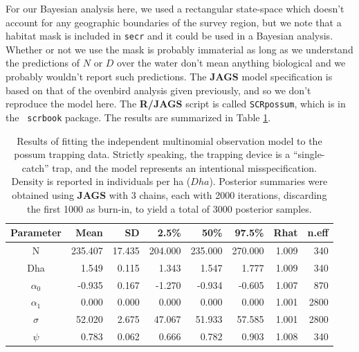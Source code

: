 For our Bayesian analysis here, we used a rectangular state-space
which doesn't account for any geographic boundaries of the survey
region, but we note that a habitat mask is included in {\tt secr} and
it could be used in a Bayesian analysis.  Whether or not we use the
mask is probably immaterial as long as we understand the predictions
of $N$ or $D$ over the water don't mean anything biological and we
probably wouldn't report such predictions.  The {\bf JAGS} model
specification is based on that of the ovenbird analysis given
previously, and so we don't reproduce the model here. The {\bf R/JAGS}
script is called \mbox{\tt SCRpossum}, which is in the \mbox{\tt
  scrbook} package.  The results are summarized in Table
\ref{poisson-mn.tab.possum}.



\begin{table}[ht]
\centering
\caption{Results of fitting the independent multinomial observation
 model to the possum trapping data. Strictly speaking, the trapping
  device is a ``single-catch'' trap, and the model represents an intentional
  misspecification. Density is reported in individuals per ha ($Dha$).
Posterior summaries were obtained using {\bf JAGS} with
 3 chains, each with 2000 iterations, discarding the first 1000 as
 burn-in, to yield a total of 3000 posterior samples.
}
\begin{tabular}{crrrrrrr} \hline \hline
 Parameter & Mean &  SD   & 2.5\% & 50\%  & 97.5\% &Rhat& n.eff \\ \hline
N        & 235.407&  17.435& 204.000& 235.000& 270.000& 1.009&   340\\
Dha      & 1.549  &  0.115&   1.343 &  1.547 &  1.777 &1.009 &  340\\
$\alpha_0$   &-0.935  &  0.167 & -1.270 & -0.934 &  -0.605& 1.007&   870\\
$\alpha_1$   &0.000   & 0.000  & 0.000  & 0.000  &   0.000& 1.001&  2800\\
$\sigma$   &52.020   & 2.675  &47.067  & 51.933 &  57.585& 1.001&
2800 \\
$\psi$      &0.783   & 0.062  & 0.666  & 0.782  &   0.903& 1.008&
340\\ \hline
\end{tabular}
\label{poisson-mn.tab.possum}
\end{table}

